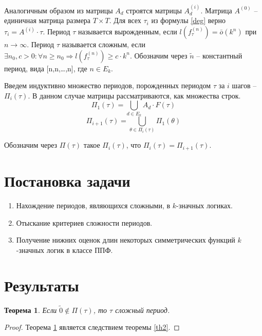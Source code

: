 \documentclass[bibliography=totoc, a4paper, 14pt]{extarticle}
\let\stdsection\section
\renewcommand\section{\newpage\stdsection}
\newtheorem{myth}{Теорема}
\begin{document}
Аналогичным образом из матрицы $A_d$ строятся матрицы $A_d^{(i)}$.
Матрица $A^{(0)}$ -- единичная матрица размера $T \times T$.
Для всех $\tau_i$ из формулы \eqref{deg} верно $\tau_i = A^{(i)} \cdot \tau$.
Период $\tau$ называется вырожденным, если $l(f_{\tau}^{(n)}) = \bar{o}(k^n)$ при $n\rightarrow\infty$.
Период $\tau$ называется сложным, если
$\exists n_0, c > 0 : \forall n \geqslant n_0 \Rightarrow l(f_{\tau}^{(n)}) \geqslant c \cdot k^n$.
Обозначим через $\tilde{n}$ -- константный период, вида [n,n,\ldots,n], где $n \in E_k$.

Введем индуктивно множество периодов, порожденных периодом $\tau$ за $i$ шагов -- $\Pi_i(\tau)$.
В данном случае матрицы рассматриваются, как множества строк.
$$\Pi_1(\tau) = \underset{d \in E_k}{\bigcup} A_d \cdot F(\tau)$$
$$\Pi_{i+1}(\tau) = \underset{\theta \in \Pi_i(\tau)}{\bigcup} \Pi_1(\theta)$$

Обозначим через $\Pi(\tau)$ такое $\Pi_i(\tau)$, что $\Pi_i(\tau) = \Pi_{i+1}(\tau)$.

\section{Постановка задачи}
\begin{enumerate}
\item Нахождение периодов, являющихся сложными, в $k$-значных логиках.

\item Отыскание критериев сложности периодов.

\item Получение нижних оценок длин некоторых симметрических функций $k$-значных логик в классе ППФ.
\end{enumerate}

\section{Результаты}
\begin{myth}
\label{th1}
Если $\tilde{0} \not\in \Pi(\tau)$, то $\tau$ сложный период.
\end{myth}
\begin{proof}
Теорема \ref{th1} является следствием теоремы \ref{th2}.
\end{proof}
\end{document}
